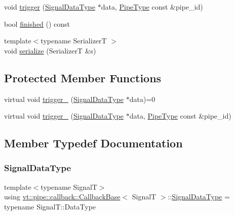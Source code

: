 \begin{DoxyCompactItemize}
void \hyperlink{structvt_1_1pipe_1_1callback_1_1_callback_base_ad54d116447acb7f1d051db946b2e875c}{trigger} (\hyperlink{structvt_1_1pipe_1_1callback_1_1_callback_base_aa1c1fd83b75220a50f6dcd7c1617726e}{Signal\+Data\+Type} $\ast$data, \hyperlink{namespacevt_ac9852acda74d1896f48f406cd72c7bd3}{Pipe\+Type} const \&pipe\+\_\+id)
\item 
bool \hyperlink{structvt_1_1pipe_1_1callback_1_1_callback_base_a20ed519d03b62560080ce3bdb8986f03}{finished} () const
\item 
{\footnotesize template$<$typename SerializerT $>$ }\\void \hyperlink{structvt_1_1pipe_1_1callback_1_1_callback_base_a4baca91fd4545ca13f34c75255209edd}{serialize} (SerializerT \&s)
\end{DoxyCompactItemize}
\subsection*{Protected Member Functions}
\begin{DoxyCompactItemize}
\item 
virtual void \hyperlink{structvt_1_1pipe_1_1callback_1_1_callback_base_a75a9b0103e0129f536385b10b86400c3}{trigger\+\_\+} (\hyperlink{structvt_1_1pipe_1_1callback_1_1_callback_base_aa1c1fd83b75220a50f6dcd7c1617726e}{Signal\+Data\+Type} $\ast$data)=0
\item 
virtual void \hyperlink{structvt_1_1pipe_1_1callback_1_1_callback_base_ac14c6c68a45c6f7e18c73daa45b23b83}{trigger\+\_\+} (\hyperlink{structvt_1_1pipe_1_1callback_1_1_callback_base_aa1c1fd83b75220a50f6dcd7c1617726e}{Signal\+Data\+Type} $\ast$data, \hyperlink{namespacevt_ac9852acda74d1896f48f406cd72c7bd3}{Pipe\+Type} const \&pipe\+\_\+id)
\end{DoxyCompactItemize}


\subsection{Member Typedef Documentation}
\mbox{\label{structvt_1_1pipe_1_1callback_1_1_callback_base_aa1c1fd83b75220a50f6dcd7c1617726e}} 
\subsubsection{\texorpdfstring{Signal\+Data\+Type}{SignalDataType}}
{\footnotesize\ttfamily template$<$typename SignalT$>$ \\
using \hyperlink{structvt_1_1pipe_1_1callback_1_1_callback_base}{vt\+::pipe\+::callback\+::\+Callback\+Base}$<$ SignalT $>$\+::\hyperlink{structvt_1_1pipe_1_1callback_1_1_callback_base_aa1c1fd83b75220a50f6dcd7c1617726e}{Signal\+Data\+Type} =  typename Signal\+T\+::\+Data\+Type}

